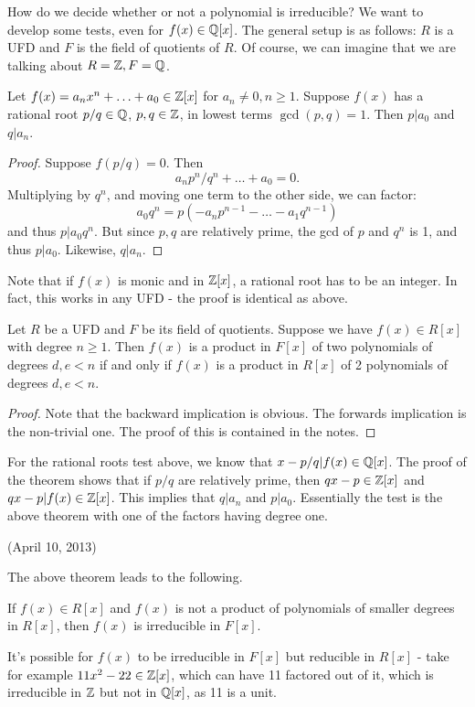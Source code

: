 \documentclass{../mathnotes}
\begin{document}
How do we decide whether or not a polynomial is irreducible? We want to develop some tests, even for $f(x)\in\mathbb{Q}[x]$. The general
setup is as follows: $R$ is a UFD and $F$ is the field of quotients of $R$. Of course, we can imagine that we are talking about
$R=\mathbb{Z},F=\mathbb{Q}$.

\begin{exmp}
    Let $f(x)=a_nx^n+\ldots+a_0\in\mathbb{Z}[x]$ for $a_n\neq 0,n\geq 1$. Suppose $f(x)$ has a rational root $p/q\in\mathbb{Q}$, $p,q\in\mathbb{Z}$,
    in lowest terms $\gcd(p,q)=1$. Then $p|a_0$ and $q|a_n$.
\end{exmp}
\begin{proof}
    Suppose $f(p/q)=0$. Then
    \[a_np^n/q^n+\ldots+a_0=0.\]
    Multiplying by $q^n$, and moving one term to the other side, we can factor:
    \[a_0q^n=p(-a_np^{n-1}-\ldots-a_1q^{n-1})\]
    and thus $p|a_0q^n$. But since $p,q$ are relatively prime, the gcd of $p$ and $q^n$ is 1, and thus $p|a_0$.
    Likewise, $q|a_n$.
\end{proof}

Note that if $f(x)$ is monic and in $\mathbb{Z}[x]$, a rational root has to be an integer. In fact, this works in any UFD -
the proof is identical as above.

\begin{thm}
    Let $R$ be a UFD and $F$ be its field of quotients. Suppose we have $f(x)\in R[x]$ with degree $n\geq 1$. Then $f(x)$ is a product in $F[x]$
    of two polynomials of degrees $d,e<n$ if and only if $f(x)$ is a product in $R[x]$ of 2 polynomials of degrees $d,e<n$.
\end{thm}
\begin{proof}
    Note that the backward implication is obvious. The forwards implication is the non-trivial one. The proof of this is contained
    in the notes.
\end{proof}

For the rational roots test above, we know that $x-p/q|f(x)\in\mathbb{Q}[x]$. The proof of the theorem shows that if $p/q$ are relatively prime,
then $qx-p\in\mathbb{Z}[x]$ and $qx-p|f(x)\in\mathbb{Z}[x]$. This implies that $q|a_n$ and $p|a_0$. Essentially the test is the above theorem with one of the
factors having degree one.

(April 10, 2013)

The above theorem leads to the following.
\begin{cor}
    If $f(x)\in R[x]$ and $f(x)$ is not a product of polynomials of smaller degrees in $R[x]$, then $f(x)$ is irreducible in $F[x]$.
\end{cor}
It's possible for $f(x)$ to be irreducible in $F[x]$ but reducible in $R[x]$ - take for example $11x^2-22\in\mathbb{Z}[x]$, which can have 11 factored
out of it, which is irreducible in $\mathbb{Z}$ but not in $\mathbb{Q}[x]$, as 11 is a unit.
\end{document}
